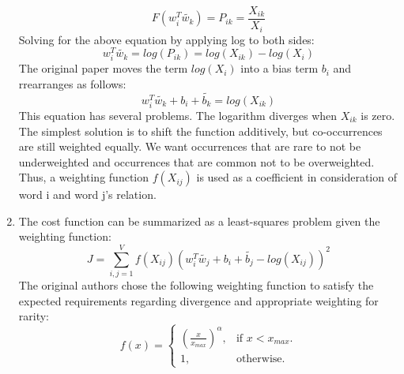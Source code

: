\begin{enumerate}
\begin{equation}
	F(w_{i}^T\tilde{w_{k}}) = P_{ik} = \frac{X_{ik}}{X_{i}}
	\end{equation}
	Solving for the above equation by applying log to both sides:
	\begin{equation}
	w_{i}^T\tilde{w_{k}} = log(P_{ik}) = log(X_{ik}) - log(X_{i}) 
	\end{equation}
	The original paper moves the term $log(X_{i})$ into a bias term $b_{i}$ and rrearranges as follows:
	\begin{equation}
	w_{i}^T\tilde{w_{k}} + b_{i} + \tilde{b_{k}} = log(X_{ik})
	\end{equation}
	This equation has several problems. The logarithm diverges when $X_{ik}$ is zero. The simplest solution is to shift the function additively, but co-occurrences are still weighted equally. We want occurrences that are rare to not be underweighted and occurrences that are common not to be overweighted. Thus, a weighting function $f(X_{ij})$ is used as a coefficient in consideration of word i and word j's relation. 
	\item The cost function can be summarized as a least-squares problem given the weighting function:
	\begin{equation}
	J = \sum_{i,j=1}^{V}f(X_{ij})(w_{i}^T\tilde{w_{j}} + b_{i} + \tilde{b_{j}} - log(X_{ij}))^2
	\end{equation}
	The original authors chose the following weighting function to satisfy the expected requirements regarding divergence and appropriate weighting for rarity:
	\begin{equation}
	f(x)=\begin{cases}
	(\frac{x}{x_{max}})^\alpha, & \text{if $x<x_{max}$}.\\
	1, & \text{otherwise}.
	\end{cases}
	\end{equation}
\end{enumerate}



